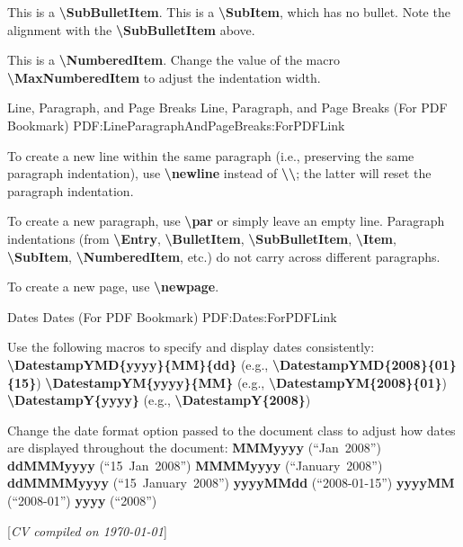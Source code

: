 \documentclass[letterpaper,MMMMyyyy,nonstopmode]{simpleresumecv}
\newcommand{\CVNote}{CV compiled on {\today}}
\newcommand{\Code}[1]{\mbox{\textbf{#1}}}
\newcommand{\CodeCommand}[1]{\mbox{\textbf{\textbackslash{#1}}}}
\begin{document}
\begin{Body}
\Gap
\SubBulletItem
This is a \CodeCommand{SubBulletItem}.
\SubItem
This is a \CodeCommand{SubItem}, which has no bullet.
Note the alignment with the \CodeCommand{SubBulletItem} above.

\Gap
\NumberedItem{[42]}
This is a \CodeCommand{NumberedItem}.
Change the value of the macro \CodeCommand{MaxNumberedItem} to adjust the indentation width.

\BigGap
\SubSection
{Line, Paragraph, and Page Breaks}
{Line, Paragraph, and Page Breaks (For PDF Bookmark)}
{PDF:LineParagraphAndPageBreaks:ForPDFLink}

\Gap
\BulletItem
To create a new line within the same paragraph (i.e., preserving the same paragraph indentation), use \CodeCommand{newline} instead of \CodeCommand{\textbackslash};
the latter will reset the paragraph indentation.

\Gap
\BulletItem
To create a new paragraph, use \CodeCommand{par} or simply leave an empty line.
Paragraph indentations (from
\CodeCommand{Entry},
\CodeCommand{BulletItem},
\CodeCommand{SubBulletItem},
\CodeCommand{Item},
\CodeCommand{SubItem},
\CodeCommand{NumberedItem},
etc.) do not carry across different paragraphs.

\Gap
\BulletItem
To create a new page, use \CodeCommand{newpage}.

\BigGap
\SubSection
{Dates}
{Dates (For PDF Bookmark)}
{PDF:Dates:ForPDFLink}

\Gap
\BulletItem
Use the following macros to specify and display dates consistently:
\SubBulletItem
\CodeCommand{DatestampYMD\{yyyy\}\{MM\}\{dd\}}
(e.g., \CodeCommand{DatestampYMD\{2008\}\{01\}\{15\}})
\SubBulletItem
\CodeCommand{DatestampYM\{yyyy\}\{MM\}}
(e.g., \CodeCommand{DatestampYM\{2008\}\{01\}})
\SubBulletItem
\CodeCommand{DatestampY\{yyyy\}}
(e.g., \CodeCommand{DatestampY\{2008\}})

\Gap
\BulletItem
Change the date format option passed to the document class to adjust how dates are displayed throughout the document:
\SubBulletItem
\Code{MMMyyyy} (``Jan~2008'')
\SubBulletItem
\Code{ddMMMyyyy} (``15~Jan~2008'')
\SubBulletItem
\Code{MMMMyyyy} (``January~2008'')
\SubBulletItem
\Code{ddMMMMyyyy} (``15~January~2008'')
\SubBulletItem
\Code{yyyyMMdd} (``2008-01-15'')
\SubBulletItem
\Code{yyyyMM} (``2008-01'')
\SubBulletItem
\Code{yyyy} (``2008'')

\endgroup

\fi

\end{Body}


\UseNoteFont%
\null\hfill%
[\textit{\CVNote}]
\end{document}
